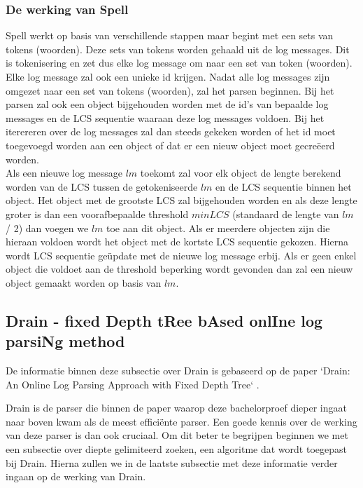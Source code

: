 \subsubsection{De werking van Spell}
Spell werkt op basis van verschillende stappen maar begint met een sets van tokens (woorden). Deze sets van tokens worden gehaald uit de log messages. Dit is tokenisering en zet dus elke log message om naar een set van token (woorden). Elke log message zal ook een unieke id krijgen. Nadat alle log messages zijn omgezet naar een set van tokens (woorden), zal het parsen beginnen. Bij het parsen zal ook een object bijgehouden worden met de id's van bepaalde log messages en de LCS sequentie waaraan deze log messages voldoen. Bij het iterereren over de log messages zal dan steeds gekeken worden of het id moet toegevoegd worden aan een object of dat er een nieuw object moet gecreëerd worden.\\

Als een nieuwe log message $lm$ toekomt zal voor elk object de lengte berekend worden van de LCS tussen de getokeniseerde $lm$ en de LCS sequentie binnen het object. Het object met de grootste LCS zal bijgehouden worden en als deze lengte groter is dan een voorafbepaalde threshold $minLCS$ (standaard de lengte van $lm$ / 2) dan voegen we $lm$ toe aan dit object. Als er meerdere objecten zijn die hieraan voldoen wordt het object met de kortste LCS sequentie gekozen. Hierna wordt LCS sequentie geüpdate met de nieuwe log message erbij. Als er geen enkel object die voldoet aan de threshold beperking wordt gevonden dan zal een nieuw object gemaakt worden op basis van $lm$.

\subsection{Drain - fixed Depth tRee bAsed onlIne log parsiNg method}
De informatie binnen deze subsectie over Drain is gebaseerd op de paper `Drain: An Online Log Parsing Approach with Fixed Depth Tree` \autocite{he2017drain}.

Drain is de parser die binnen de paper waarop deze bachelorproef dieper ingaat \autocite{TBA2019} naar boven kwam als de meest efficiënte parser. Een goede kennis over de werking van deze parser is dan ook cruciaal. Om dit beter te begrijpen beginnen we met een subsectie over diepte gelimiteerd zoeken, een algoritme dat wordt toegepast bij Drain. Hierna zullen we in de laatste subsectie met deze informatie verder ingaan op de werking van Drain.

